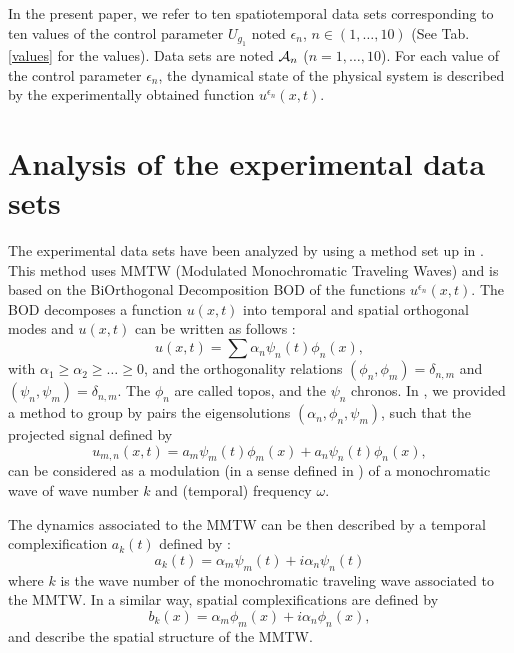 In the present paper, we refer to ten spatiotemporal data sets
corresponding to ten values of the control parameter $U_{g_1}$ noted
$\epsilon_n$, $n\in (1,\dots,10)$ (See
Tab. \ref{values} for the values).
Data sets are noted  ${\cal A}_n$ ($n=1,\dots,10$).
For each value of the control parameter $\epsilon_n$, 
the dynamical state of the physical system is described by
the experimentally obtained function $u^{\epsilon_n}(x,t)$.

\section{Analysis of the experimental data sets}\label{analysis}
The experimental data sets have been analyzed by using a method set up
in \cite{Madon96}. This method uses MMTW (Modulated Monochromatic
Traveling Waves) and is based on the BiOrthogonal
Decomposition BOD \cite{LimaCom,LimaSym,LimaMod} of the functions
$u^{\epsilon_n}(x,t)$. 
The BOD decomposes a function $u(x,t)$ into temporal  and 
spatial orthogonal modes and $u(x,t)$ can be written as follows :
\begin{equation}
u(x,t)=\sum \alpha_n \psi_n(t)\phi_n(x),
\end{equation}
with $\alpha_1\geq\alpha_2\geq\dots\geq 0$, and the orthogonality
 relations $(\phi_n,\phi_m)=\delta_{n,m}$ and 
$(\psi_n,\psi_m)=\delta_{n,m}$. The $\phi_n$ are called topos,
 and the $\psi_n$ chronos.
In \cite{Madon96}, we provided a method to group by pairs the
eigensolutions $(\alpha_n,\phi_n,\psi_m)$, such that the projected
signal defined by 
\begin{equation}
u_{m,n}(x,t)=a_m \psi_m(t)\phi_m(x)+a_n \psi_n(t)\phi_n(x),
\end{equation}
can be considered as a modulation (in a sense defined in
\cite{Madon96}) of a monochromatic  wave of wave number $k$
and (temporal) frequency $\omega$.


The dynamics
associated to the MMTW can be then described by a temporal
complexification $a_k(t)$ defined by :
\begin{equation}
a_k(t)=\alpha_m\psi_m(t)+i\alpha_n\psi_n(t)
\end{equation}
where $k$ is the wave number of the monochromatic traveling wave
associated to the MMTW.
In a similar way, spatial complexifications are defined by 
\begin{equation}
b_k(x)=\alpha_m\phi_m(x)+i\alpha_n\phi_n(x),
\end{equation}
and describe the spatial structure of the MMTW.

